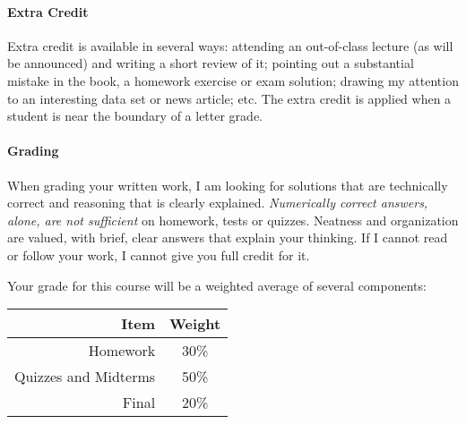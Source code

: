 \documentclass[11pt]{article}
\begin{document}
\paragraph{Extra Credit}
Extra credit is available in several ways: attending an out-of-class lecture (as will be announced) and writing a short review of it; pointing out a substantial mistake in the book, a homework exercise or exam solution; drawing my attention to an interesting data set or news article; etc. The extra credit is applied when a student is near the boundary of a letter grade.

\paragraph{Grading}
When grading your written work, I am looking for solutions that are technically correct and reasoning that is clearly explained.  \emph{Numerically correct answers, alone, are not sufficient} on homework, tests or quizzes.  Neatness and organization are valued, with brief, clear answers that explain your thinking.  If I cannot read or follow your work, I cannot give you full credit for it.

Your grade for this course will be a weighted average of several components:

\begin{table}[!h]
\centering
\begin{tabular}{r c}
\toprule
Item & Weight \\
\midrule
Homework & 30\% \\
\cmidrule(r){1-2}
\cmidrule(r){1-2}
Quizzes and Midterms & 50\% \\
\cmidrule(r){1-2}
Final & 20\% \\
\bottomrule
\end{tabular}
\end{table}
\end{document}
